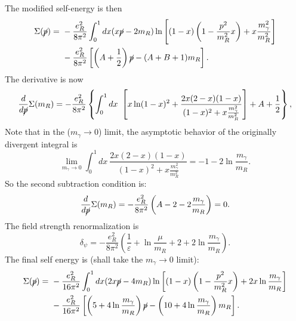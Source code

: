 The modified self-energy is then
\begin{equation}
\begin{aligned}
	\Sigma(\cancel p)
	=&\ -\frac{e_R^2}{8\pi^2} \int_0^1 dx(x\cancel{p}-2m_R)\ln\left[(1-x)\left(1- \frac{p^2}{m_R^2} x \right) + x \frac{m_\gamma^2}{m_R^2} \right]\\
	&\  -\frac{e_R^2}{8\pi^2} \left[\left(A+\frac{1}{2}\right)\cancel p - (A+B+1)m_R\right].
\end{aligned}
\end{equation}
The derivative is now
\begin{equation}
	\frac{d}{d \cancel p}\Sigma(m_R)  
	= -\frac{e_R^2}{8\pi^2} \left\{ \int_0^1 dx\ \left[ x\ln(1-x)^2 +\frac{2x(2-x)(1-x)}{(1-x)^2 + x \frac{m_\gamma^2}{m_R^2}} \right] + A + \frac{1}{2}\right\},
\end{equation}
Note that in the ($m_\gamma \rightarrow 0$) limit, the asymptotic behavior of the originally divergent integral is
\begin{equation}
	\lim_{m_\gamma \rightarrow 0} \int_0^1 dx\ \frac{2x(2-x)(1-x)}{(1-x)^2 + x \frac{m_\gamma^2}{m_R^2}}
	= -1 - 2\ln \frac{m_\gamma}{m_R}.
\end{equation}
So the second subtraction condition is:
\begin{equation}
	\frac{d}{d \cancel p}\Sigma(m_R)  
	= -\frac{e_R^2}{8\pi^2} \left(A -2 - 2\frac{m_\gamma}{m_R} \right) = 0.
\end{equation}
The field strength renormalization is
\begin{equation}
	\delta_\psi = -\frac{e_R^2}{8\pi^2}\left(\frac{1}{\varepsilon}+\ln\frac{\mu}{m_R} +2+2\ln\frac{m_\gamma}{m_R}\right).
\end{equation}
The final self energy is (shall take the $m_\gamma \rightarrow 0$ limit):
\begin{equation}
\begin{aligned}
	\Sigma(\cancel p)
	=&\ -\frac{e_R^2}{16\pi^2} \int_0^1 dx(2x\cancel{p}-4m_R)\ln\left[(1-x)\left(1- \frac{p^2}{m_R^2} x \right) + 2x \ln\frac{m_\gamma}{m_R} \right]\\
	&\  -\frac{e_R^2}{16\pi^2} \left[\left(5+4\ln\frac{m_\gamma}{m_R}\right)\cancel p - \left(10 +4\ln\frac{m_\gamma}{m_R}\right)m_R\right].
\end{aligned}
\end{equation}



